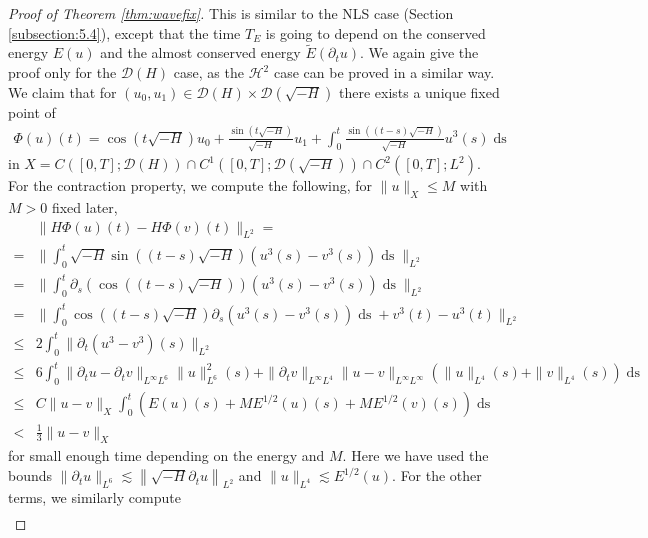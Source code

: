 \documentclass[11pt, oneside]{article}   	%
\newcommand{\tmop}[1]{\ensuremath{\operatorname{#1}}}
\newcommand{\ssp}{\mathscr{H}}
\begin{document}
\begin{proof}[Proof of Theorem \ref{thm:wavefix}]
	This is similar to the NLS case (Section \ref{subsection:5.4}), except that the time $T_E$ is going to depend
	on the conserved energy $E (u)$ and the almost conserved energy $\tilde{E}
	(\partial_t u) .$ We again give the proof only for the $\mathscr{D}(H)$ case,  as the $\ssp^2$ case can be proved in a similar way.\\
	We claim that for $(u_0, u_1) \in \mathscr{D} (H) \times \mathscr{D}
	\left( \sqrt{- H} \right)$ there exists a unique fixed point of
	\begin{align*}
	\Phi (u)(t)= \cos \left( t \sqrt{- H} \right) u_0 + \frac{\sin \left( t
		\sqrt{- H} \right)}{\sqrt{- H}} u_1 + \int_{0}^{t}
	\frac{\sin \left( (t-s) \sqrt{- H} \right)}{\sqrt{- H}} u^3 ( s) \tmop{ds}
	\end{align*}
	in $X = C ([0, T] ; \mathscr{D} (H)) \cap C^1 \left( [0, T] ; \mathscr{D}
	\left( \sqrt{- H} \right) \right) \cap C^2 ([0, T] ; L^2)$.\\
	For the contraction property, we compute the following,  for $\|u\|_X\le M$ with $M>0$ fixed later, 
	\begin{align*}
	& \| H \Phi (u) (t) - H \Phi (v) (t) \|_{L^2} = \\
	=&\| \int_{0}^{t} \sqrt{-H} \sin((t-s)\sqrt{-H})(u^3(s)-v^3(s)) \tmop{ds} \|_{L^2}
	\\ 
	=&\| \int_{0}^{t} \partial_s( \cos((t-s)\sqrt{-H}))(u^3(s)-v^3(s)) \tmop{ds} \|_{L^2}\\
	=&\| \int_{0}^{t}  \cos((t-s)\sqrt{-H})\partial_s(u^3(s)-v^3(s)) \tmop{ds}+v^3(t)-u^3(t) \|_{L^2}
	\\ \le &2
	\int_{0}^{t} \| \partial_t (u^3 - v^3) (s) \|_{L^2}\\
	\le & 6 \int_{0}^{t} \| \partial_t u -
	\partial_t v \|_{L^{\infty} L^6} \| u \|^2_{L^6} (s) + \| \partial_t v
	\|_{L^{\infty} L^4} \| u - v \|_{L^{\infty} L^{\infty}} (\| u \|_{L^4} (s) +
	\| v \|_{L^4} (s)) \tmop{ds}\\
	\le & C \| u - v \|_X \int_{0}^{t} (E (u) (s) +
	M E^{1 / 2} (u) (s) + M E^{1 / 2} (v) (s)) \tmop{ds}\\
	< & \frac{1}{3} \| u - v \|_X
	\end{align*}
	for small enough time depending on the energy and $M$. Here we have used the bounds
	$\| \partial_t u \|_{L^6} \lesssim \left\| \sqrt{- H} \partial_t u
	\right\|_{L^2}$ and $\| u \|_{L^4} \lesssim E^{1/2} (u)$.
	For the other terms, we similarly compute 
	\begin{align*}

\end{align*}
\end{proof}
\end{document}
